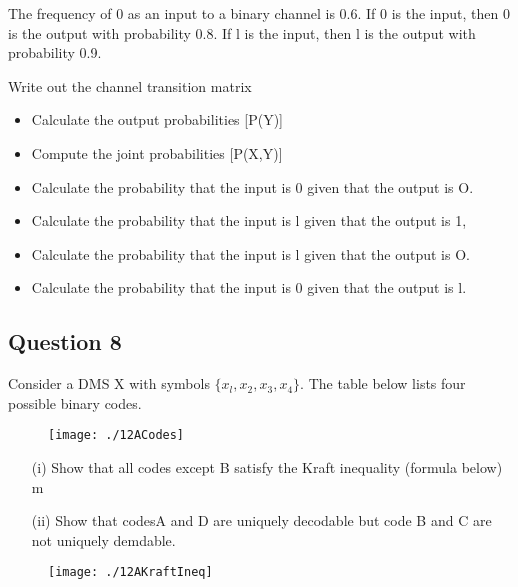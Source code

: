 The frequency of 0 as an input to a binary channel is 0.6. If 0 is the input, then 0 is the output with probability 0.8. If l is the input, then l is the output with probability 0.9.

Write out the channel transition matrix

\begin{itemize}
\item	Calculate the output probabilities [P(Y)] 
\item	Compute the joint probabilities [P(X,Y)]
\item	Calculate the probability that the input is 0 given that the output is O. 
\item Calculate the probability that the input is l given that the output is 1, 
\item	Calculate the probability that the input is l given that the output is O.
\item	Calculate the probability that the input is 0 given that the output is l. 
\end{itemize}


\subsection*{Question 8 }
Consider a DMS X with symbols $\{x_l,x_2,x_3,x_4\}$. The table below lists four possible
binary codes.

\begin{figure}[h!]
\centering
\texttt{[image: ./12ACodes]}
\caption{}
\label{fig:12ACodes}
\end{figure}



\begin{itemize}
\item[(i)] Show that all codes except B satisfy the Kraft inequality (formula below)
m
\item[(ii)] Show that codesA and D are uniquely decodable but code B and C are not
uniquely demdable.
\end{itemize}
\begin{figure}[h!]
\centering
\texttt{[image: ./12AKraftIneq]}
\caption{}
\label{fig:12AKraftIneq}
\end{figure}


